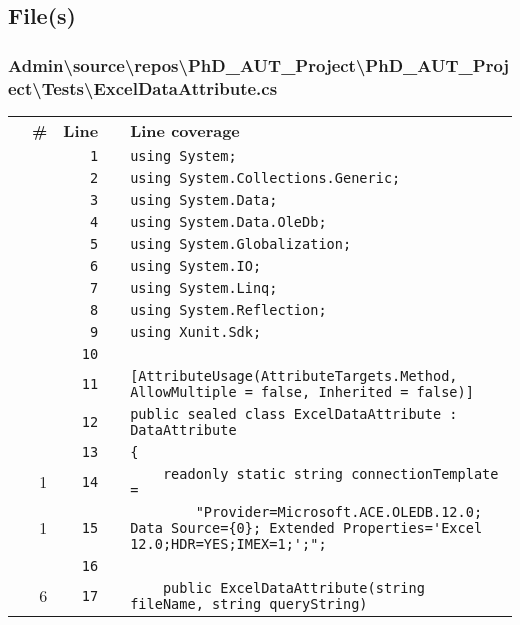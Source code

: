 \documentclass[a4paper,landscape,10pt]{article}
\begin{document}
\subsection{File(s)}
\subsubsection{Admin\textbackslash source\textbackslash repos\textbackslash PhD\_AUT\_Project\textbackslash PhD\_AUT\_Project\textbackslash Tests\textbackslash ExcelDataAttribute.cs}
\begin{longtable}[l]{lrrll}
\textbf{} & \textbf{\#} & \textbf{Line} & \textbf{} & \textbf{Line coverage}\\
\cellcolor{gray} &  & \verb~1~ & & \verb~using System;~\\
\cellcolor{gray} &  & \verb~2~ & & \verb~using System.Collections.Generic;~\\
\cellcolor{gray} &  & \verb~3~ & & \verb~using System.Data;~\\
\cellcolor{gray} &  & \verb~4~ & & \verb~using System.Data.OleDb;~\\
\cellcolor{gray} &  & \verb~5~ & & \verb~using System.Globalization;~\\
\cellcolor{gray} &  & \verb~6~ & & \verb~using System.IO;~\\
\cellcolor{gray} &  & \verb~7~ & & \verb~using System.Linq;~\\
\cellcolor{gray} &  & \verb~8~ & & \verb~using System.Reflection;~\\
\cellcolor{gray} &  & \verb~9~ & & \verb~using Xunit.Sdk;~\\
\cellcolor{gray} &  & \verb~10~ & & \verb~~\\
\cellcolor{gray} &  & \verb~11~ & & \verb~[AttributeUsage(AttributeTargets.Method, AllowMultiple = false, Inherited = false)]~\\
\cellcolor{gray} &  & \verb~12~ & & \verb~public sealed class ExcelDataAttribute : DataAttribute~\\
\cellcolor{gray} &  & \verb~13~ & & \verb~{~\\
\cellcolor{green} & 1 & \verb~14~ & & \verb~    readonly static string connectionTemplate =~\\
\cellcolor{green} & 1 & \verb~15~ & & \verb~        "Provider=Microsoft.ACE.OLEDB.12.0; Data Source={0}; Extended Properties='Excel 12.0;HDR=YES;IMEX=1;';";~\\
\cellcolor{gray} &  & \verb~16~ & & \verb~~\\
\cellcolor{green} & 6 & \verb~17~ & & \verb~    public ExcelDataAttribute(string fileName, string queryString)~\\

\end{longtable}
\end{document}
